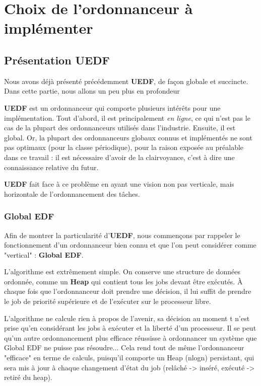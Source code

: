 

\section{Choix de l'ordonnanceur à implémenter}

	\subsection{Présentation UEDF}
	
	Nous avons déjà présenté précédemment \textbf{UEDF}, de façon globale et succincte. 
	Dans cette partie, nous allons un peu plus en profondeur 
	
	\textbf{UEDF} est un ordonnanceur qui comporte plusieurs intérêts pour une implémentation.
	Tout d'abord, il est principalement \textit{en ligne}, ce qui n'est pas le cas de 
	la plupart des ordonnanceurs utilisés dans l'industrie.
	Ensuite, il est global. Or, la plupart des ordonnanceurs 
	globaux connus et implémentés ne sont pas optimaux (pour la classe périodique), pour la
	raison exposée au préalable dans ce travail : il est nécessaire d'avoir de la clairvoyance, 
	c'est à dire une connaissance relative du futur.
	
	\textbf{UEDF} fait face à ce problème en ayant une vision non pas verticale, mais horizontale 
	de l'ordonnancement des tâches. 

		\subsubsection{Global EDF}
		Afin de montrer la particularité d'\textbf{UEDF}, nous commençons par rappeler le fonctionnement 
		d'un ordonnanceur bien connu et que l'on peut considérer comme "vertical" : \textbf{Global EDF}. 
		
		L'algorithme est extrêmement simple. On conserve une structure de données 
		ordonnée, comme un \textbf{Heap}  qui contient tous les jobs 
		devant être exécutés. À chaque fois que l'ordonnanceur doit prendre 
		une décision, il lui suffit de prendre le job de priorité supérieure et 
		de l'exécuter sur le processeur libre.
		
		L'algorithme ne calcule rien à propos de l'avenir, sa décision au moment t
		n'est prise qu'en considérant les jobs à exécuter et la liberté d'un 
		processeur. Il se peut qu'un autre ordonnancement plus efficace 
		réussisse à ordonnancer un système que Global EDF ne puisse pas résoudre...
		Cela rend tout de même l'ordonnanceur "efficace" en terme de calculs, 
		puisqu'il comporte un Heap (nlogn) persistant, qui sera mis à jour 
		à chaque changement d'état du job (relâché -> inséré, 
		exécuté -> retiré du heap).
		
